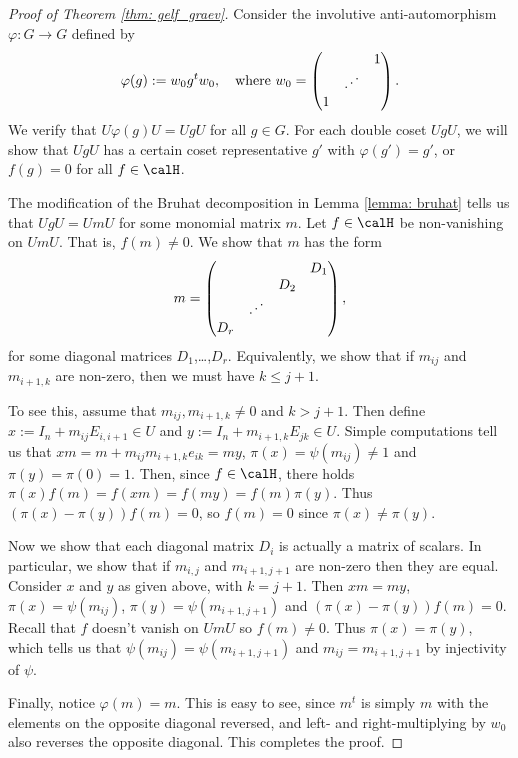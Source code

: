 \documentclass[11pt]{amsart}
\theoremstyle{remark}
\begin{document}
\begin{proof}[Proof of Theorem \ref{thm: gelf_graev}]
	Consider the involutive anti-automorphism $\varphi\colon G \to G$ defined by
	\[
		\varphi(g) := w_0 g^t w_0,\quad\text{where}\ w_0 =
		\begin{pmatrix}
			  &                       & 1 \\
			  & \reflectbox{$\ddots$} &   \\
			1 &                       &
		\end{pmatrix}.
	\]
	We verify that $U\varphi(g)U=UgU$ for all $g\in G$.
	For each double coset $UgU$, we will show that $UgU$ has a certain coset representative $g'$ with $\varphi(g')=g'$, or $f(g)=0$ for all $f\in\calH$.

	The modification of the Bruhat decomposition in Lemma \ref{lemma: bruhat} tells us that $UgU=UmU$ for some monomial matrix $m$.
	Let $f\in\calH$ be non-vanishing on $UmU$.
	That is, $f(m)\neq 0$.
	We show that $m$ has the form
	\[
		m = \begin{pmatrix}
			    &                       &     & D_1 \\
			    &                       & D_2 &     \\
			    & \reflectbox{$\ddots$} &     &     \\
			D_r &                       &     &
		\end{pmatrix},
	\]
	for some diagonal matrices $D_1$,\ldots,$D_r$.
	Equivalently, we show that if $m_{ij}$ and $m_{i+1,k}$ are non-zero, then we must have $k\leq j+1$.

	To see this, assume that $m_{ij},m_{i+1,k}\neq 0$ and $k>j+1$.
	Then define $x :=I_n + m_{ij}E_{i,i+1}\in U$ and $y:= I_n +m_{i+1,k}E_{jk}\in U$.
	Simple computations tell us that $xm = m+m_{ij}m_{i+1,k}e_{ik} = my$, $\pi(x)=\psi(m_{ij})\neq 1$ and $\pi(y)=\pi(0)=1$.
	Then, since $f\in\calH$, there holds $\pi(x)f(m)=f(xm)=f(my)=f(m)\pi(y)$.
	Thus $(\pi(x)-\pi(y))f(m)=0$, so $f(m)=0$ since $\pi(x)\neq \pi(y)$.

	Now we show that each diagonal matrix $D_i$ is actually a matrix of scalars.
	In particular, we show that if $m_{i,j}$ and $m_{i+1,j+1}$ are non-zero then they are equal.
	Consider $x$ and $y$ as given above, with $k=j+1$.
	Then $xm=my$, $\pi(x)=\psi(m_{ij})$, $\pi(y)=\psi(m_{i+1,j+1})$ and $(\pi(x)-\pi(y))f(m)=0$.
	Recall that $f$ doesn't vanish on $UmU$ so $f(m)\neq 0$.
	Thus $\pi(x)=\pi(y)$, which tells us that $\psi(m_{ij})=\psi(m_{i+1,j+1})$ and $m_{ij}=m_{i+1,j+1}$ by injectivity of $\psi$.

	Finally, notice $\varphi(m)=m$.
	This is easy to see, since $m^t$ is simply $m$ with the elements on the opposite diagonal reversed, and left- and right-multiplying by $w_0$ also reverses the opposite diagonal.
	This completes the proof.
\end{proof}
\end{document}
